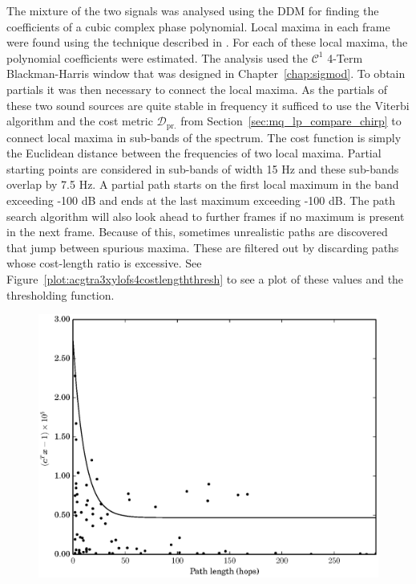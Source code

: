 The mixture of the two signals was analysed using the DDM for finding the
coefficients of a cubic complex phase polynomial. Local maxima in each frame
were found using the technique described in \cite[p.~42]{serra1989system}. For
each of these local maxima, the polynomial coefficients were estimated. The
analysis used the $\mathcal{C}^{1}$ 4-Term Blackman-Harris window that was
designed in Chapter~\ref{chap:sigmod}. To obtain
partials it was then necessary to connect the local maxima. As the partials of
these two sound sources are quite stable in frequency it sufficed to use the
Viterbi algorithm \cite{forney1973viterbi} and the cost metric
$\mathcal{D}_{\text{pr.}}$ from Section~\ref{sec:mq_lp_compare_chirp} to connect
local maxima in sub-bands of the spectrum. The cost function is simply the
Euclidean distance between the frequencies of two local maxima. Partial starting
points are considered in sub-bands of width 15 Hz and these sub-bands overlap by
7.5 Hz. A partial path starts on the first local maximum in the band exceeding
-100 dB and ends at the last maximum exceeding -100 dB. The path search
algorithm will also look ahead to further frames if no maximum is present in the
next frame. Because of this, sometimes unrealistic paths are discovered that
jump between spurious maxima. These are filtered out by discarding paths whose
cost-length ratio is excessive. See
Figure~\ref{plot:acgtra3xylofs4costlengththresh} to see a plot of these values
and the thresholding function. 

\begin{figure}[t]
    \centering
    \includegraphics[width=\figwidthscale\textwidth]{plots/partial_estimation_acgtr_xylo_pcost_vs_bound.eps}
\end{figure}

